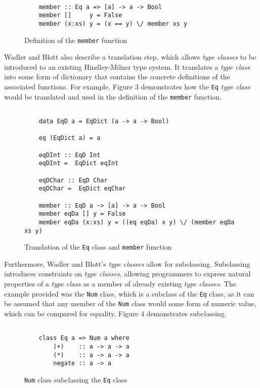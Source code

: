 \documentclass[a4paper,fleqn,notitlepage]{scrartcl}
\begin{document}
\begin{figure}
\caption{Definition of the \protect\texttt{member} function}
\begin{verbatim}
    
    member :: Eq a => [a] -> a -> Bool
    member []     y = False
    member (x:xs) y = (x == y) \/ member xs y

\end{verbatim}
\end{figure}

Wadler and Blott also describe a translation step, which allows \textit{type classes}
to be introduced to an existing Hindley-Milner type system. It translates a
\textit{type class} into some form of dictionary that contains the concrete
definitions of the associated functions. For example, Figure 3 demonstrates how the
\verb|Eq| \textit{type class} would be translated and used in the definition of the
\verb|member| function.

\begin{figure}
\caption{Translation of the \protect\texttt{Eq} class and \protect\texttt{member} function}
\begin{verbatim}
    
    data EqD a = EqDict (a -> a -> Bool)
    
    eq (EqDict a) = a
    
    eqDInt :: EqD Int
    eqDInt =  EqDict eqInt
    
    eqDChar :: EqD Char
    eqDChar =  EqDict eqChar
    
    member :: EqD a -> [a] -> a -> Bool
    member eqDa [] y = False
    member eqDa (x:xs) y = ((eq eqDa) x y) \/ (member eqDa xs y)

\end{verbatim}
\end{figure}

Furthermore, Wadler and Blott's \textit{type classes} allow for subclassing.
Subclassing introduces constraints on \textit{type classes}, allowing programmers
to express natural properties of a \textit{type class} as a member of already
existing \textit{type classes}. The example provided was the \verb|Num| class,
which is a subclass of the \verb|Eq| class, as it can be assumed that any member
of the \verb|Num| class would some form of numeric value, which can be compared
for equality. Figure 4 demonstrates subclassing.

\begin{figure}
\caption{\protect\texttt{Num} class subclassing the \protect\texttt{Eq} class}
\begin{verbatim}
    
    class Eq a => Num a where
        (+)    :: a -> a -> a
        (*)    :: a -> a -> a
        negate :: a -> a

\end{verbatim}
\end{figure}
\end{document}
